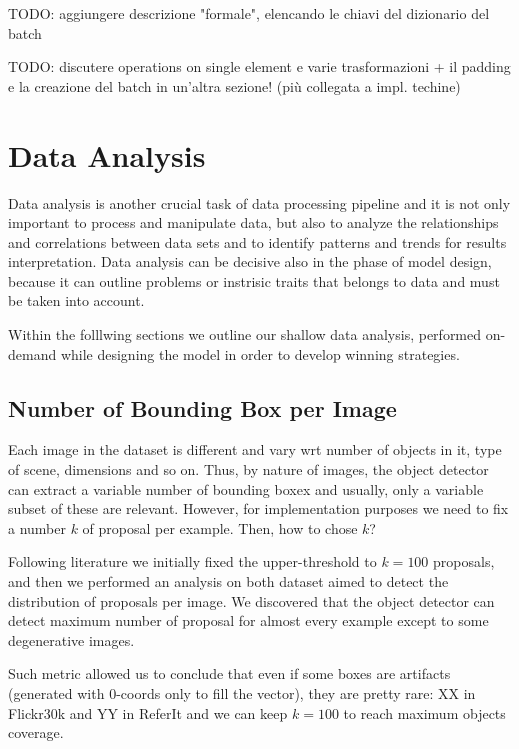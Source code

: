TODO: aggiungere descrizione "formale", elencando le chiavi del dizionario del batch




TODO: discutere operations on single element e varie trasformazioni + il padding e la creazione del batch in un'altra sezione! (più collegata a impl. techine)

\section{Data Analysis}

Data analysis is another crucial task of data processing pipeline and
it is not only important to process and manipulate data, but also to
analyze the relationships and correlations between data sets and to
identify patterns and trends for results interpretation.  Data analysis can be
decisive also in the phase of model design, because it can outline
problems or instrisic traits that belongs to data and must be taken
into account.

Within the folllwing sections we outline our shallow data analysis,
performed on-demand while designing the model in order to develop
winning strategies.

\subsection{Number of Bounding Box per Image}

Each image in the dataset is different and vary wrt number of objects
in it, type of scene, dimensions and so on. Thus, by nature of images,
the object detector can extract a variable number of bounding boxex
and usually, only a variable subset of these are relevant. However,
for implementation purposes we need to fix a number $k$ of proposal
per example. Then, how to chose $k$? 

Following literature we initially fixed the upper-threshold to $k =
100$ proposals, and then we performed an analysis on both dataset
aimed to detect the distribution of proposals per image. We discovered
that the object detector can detect maximum number of proposal for
almost every example except to some degenerative images.

Such metric allowed us to conclude that even if some boxes are
artifacts (generated with $0$-coords only to fill the vector), they
are pretty rare: XX in Flickr30k and YY in ReferIt 
and we can keep $k = 100$ to reach maximum objects coverage.


